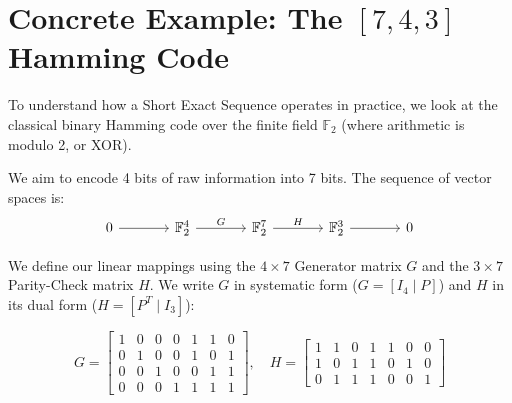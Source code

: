 \documentclass[11pt, a4paper, twoside]{article}
\newcommand{\F}{\mathbb{F}}
\begin{document}
	
	\section*{Concrete Example: The $[7,4,3]$ Hamming Code}
	
	To understand how a Short Exact Sequence operates in practice, we look at the classical binary Hamming code over the finite field $\F_2$ (where arithmetic is modulo 2, or XOR). 
	
	\begin{examplebox}
		We aim to encode 4 bits of raw information into 7 bits. The sequence of vector spaces is:
		\[
		\begin{tikzcd}[column sep=large]
			0 \arrow[r] & \F_2^4 \arrow[r, "G"] & \F_2^7 \arrow[r, "H"] & \F_2^3 \arrow[r] & 0
		\end{tikzcd}
		\]
		
		We define our linear mappings using the $4 \times 7$ Generator matrix $G$ and the $3 \times 7$ Parity-Check matrix $H$. We write $G$ in systematic form ($G = [I_4 \mid P]$) and $H$ in its dual form ($H = [P^T \mid I_3]$):
		
		$$
		G = \begin{bmatrix} 
			1 & 0 & 0 & 0 & 1 & 1 & 0 \\ 
			0 & 1 & 0 & 0 & 1 & 0 & 1 \\ 
			0 & 0 & 1 & 0 & 0 & 1 & 1 \\ 
			0 & 0 & 0 & 1 & 1 & 1 & 1 
		\end{bmatrix},
		\quad
		H = \begin{bmatrix} 
			1 & 1 & 0 & 1 & 1 & 0 & 0 \\ 
			1 & 0 & 1 & 1 & 0 & 1 & 0 \\ 
			0 & 1 & 1 & 1 & 0 & 0 & 1 
		\end{bmatrix}
		$$
	\end{examplebox}
	
	\vspace{1em}
	
\end{document}
